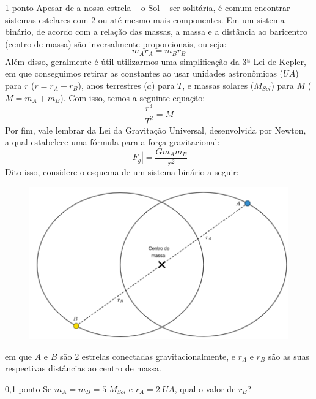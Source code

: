 \documentclass{../lista}
\begin{document}
	\begin{questao}{1 ponto}
		Apesar de a nossa estrela -- o Sol -- ser solitária, é comum encontrar sistemas estelares com 2 ou até mesmo mais componentes. Em um sistema binário, de acordo com a relação das massas, a massa e a distância ao baricentro (centro de massa) são inversalmente proporcionais, ou seja:
		\begin{equation}
			m_Ar_A=m_Br_B
		\end{equation}
		Além disso, geralmente é útil utilizarmos uma simplificação da 3ª Lei de Kepler, em que conseguimos retirar as constantes ao usar unidades astronômicas ($UA$) para $r$ ($r=r_A+r_B$), anos terrestres ($a$) para $T$, e massas solares ($M_{Sol}$) para $M$ ($M=m_A+m_B$). Com isso, temos a seguinte equação:
		\begin{equation}
			\frac{r^3}{T^2}=M
		\end{equation}
		Por fim, vale lembrar da Lei da Gravitação Universal, desenvolvida por Newton, a qual estabelece uma fórmula para a força gravitacional:
		\begin{equation}
			| F_g | = \frac{Gm_Am_B}{r^2}
		\end{equation}
		Dito isso, considere o esquema de um sistema binário a seguir:
		\begin{figure}[H]
			\centering
			\includegraphics[scale=0.4]{./img/5.png}
		\end{figure}
		em que $A$ e $B$ são 2 estrelas conectadas gravitacionalmente, e $r_A$ e $r_B$ são as suas respectivas distâncias ao centro de massa.

		\begin{pergunta}{0,1 ponto}
			Se $m_A=m_B= 5 \; M_{Sol}$ e $r_A=2 \; UA$, qual o valor de $r_B$?



\end{pergunta}
\end{questao}
\end{document}
